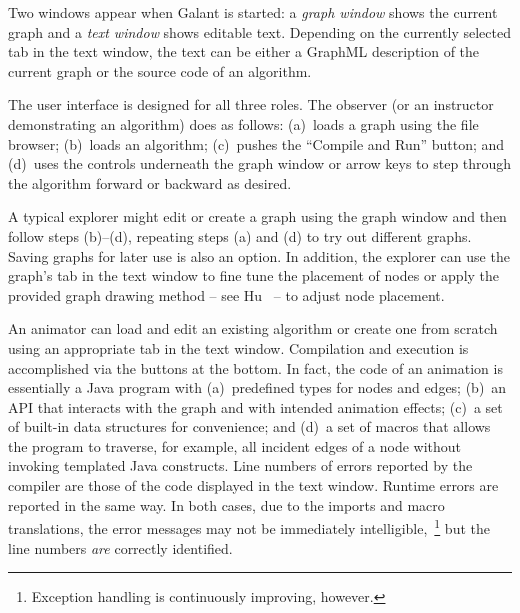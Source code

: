 Two windows appear when Galant is started: a \emph{graph window} shows the
current graph and a \emph{text window} shows editable text.
Depending on the currently selected tab in the text window,
the text can be either a GraphML description of the current graph or the source
code of an
algorithm.

The user interface is designed for all three roles.
The observer (or an instructor demonstrating an algorithm) does as follows: (a)~loads a graph using the file browser; (b)~loads an algorithm; (c)~pushes the ``Compile and Run'' button; and (d)~uses
the controls underneath the graph window or arrow keys to step through the algorithm
forward or backward as desired.

A typical explorer might edit or create a graph using the graph window and then
follow steps (b)--(d), repeating steps (a) and (d) to try out different
graphs. Saving graphs for later use is also an option.
In addition, the explorer can use the graph's tab
in the text window to fine tune the placement of
nodes or apply the provided graph drawing method
-- see Hu~\cite{2006-Mathematica-Hu} -- to adjust node placement.

An animator can load and edit an existing algorithm or create one from scratch
using an appropriate tab in the text window.
Compilation and execution is accomplished via the buttons at the bottom.
In fact, the code of an animation is essentially a Java program with
(a)~predefined types for nodes and edges; (b)~an
API that interacts with the graph and with intended animation effects; (c)~a
set of built-in data structures for convenience; and (d)~a set of macros that
allows the program to traverse, for example, all incident edges of a node
without invoking templated Java constructs.
Line numbers of errors reported by the compiler are those of the code
displayed in the text window.
Runtime errors are reported in the same way.
In both cases, due to the imports and macro translations, the error messages
may not be immediately intelligible,~\footnote{
  Exception handling is continuously improving, however.
}
but the line numbers \emph{are}
correctly identified.

